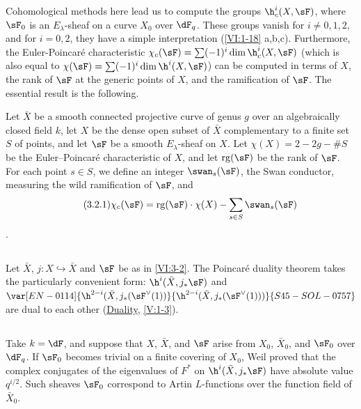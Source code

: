Cohomological methods here lead us to compute the groups 
$\h_c^i(X,\sF)$, where $\sF_0$ is an $E_\lambda$-sheaf on a curve $X_0$ over 
$\dF_q$. These groups vanish for $i\ne 0,1,2$, and for 
$i=0,2$, they have a simple interpretation (\ref{VI:1-18} a,b,c). Furthermore, the 
Euler-Poincaré characteristic 
$\chi_c(\sF) = \sum (-1)^i \dim \h_c^i(X,\sF)$ (which is also equal to 
$\chi(\sF) = \sum (-1)^i \dim \h^i(X,\sF)$) can be computed in terms of 
$X$, the rank of $\sF$ at the generic points of $X$, and the 
ramification of $\sF$. The essential result is the following. 

Let $\bar X$ be a smooth connected projective curve of genus $g$ over an 
algebraically closed field $k$, let $X$ be the dense open subset of $\bar X$ 
complementary to a finite set $S$ of points, and let $\sF$ be a 
smooth $E_\lambda$-sheaf on $X$. Let $\chi(X)=2-2 g-\# S$ be the 
Euler--Poincaré characteristic of $X$, and let $\operatorname{rg}(\sF)$ be the 
rank of $\sF$. For each point $s\in S$, we define an integer 
$\swan_s(\sF)$, the Swan conductor, measuring the wild ramification of 
$\sF$, and 
\begin{align*}\tag{3.2.1}\label{VI:eq:3-2-1}
  \chi_c(\sF) = \operatorname{rg}(\sF) \cdot \chi(X) - \sum_{s\in S} \swan_s(\sF) 
\end{align*}
. 





\subsection{}\label{VI:3-3}

Let $\bar X$, $j:X\hookrightarrow\bar X$ and $\sF$ be as in \ref{VI:3-2}. The 
Poincaré duality theorem takes the particularly convenient form: 
$\h^i(\bar X,j_\ast \sF)$ and $\var[EN-0114]{\h^{2-i}(\bar X,j_\ast(\sF^\vee(1))}{\h^{2-i}(\bar X,j_\ast(\sF^\vee(1)))}{S45-SOL-0757}$ are 
dual to each other (\hyperref[V]{Duality}, \ref{V:1-3}). 






\subsection{}\label{VI:3-4}

Take $k=\dF$, and suppose that $X$, $\bar X$, and $\sF$ arise from 
$X_0$, $\bar X_0$, and $\sF_0$ over $\dF_q$. If $\sF_0$ becomes trivial on a 
finite covering of $X_0$, Weil proved that the complex conjugates of 
the eigenvalues of $F^\ast$ on $\h^i(\bar X,j_\ast\sF)$ have absolute value 
$q^{i/2}$. Such sheaves $\sF_0$ correspond to Artin $L$-functions 
over the function field of $\bar X_0$. 





